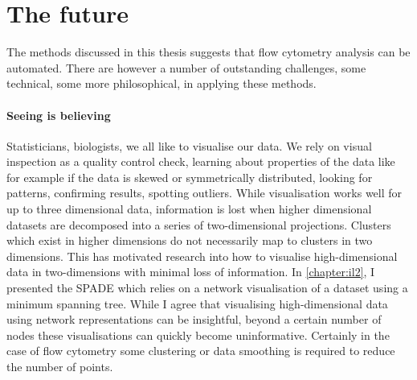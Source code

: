 
\section{ The future }

The methods discussed in this thesis suggests that flow cytometry analysis can be automated.
There are however a number of outstanding challenges, some technical, some more philosophical, in applying these methods.

\paragraph{Seeing is believing}

Statisticians, biologists, we all like to visualise our data.
We rely on visual inspection as a quality control check, learning about properties of the data like for example if the data
is skewed or symmetrically distributed, looking for patterns, confirming results, spotting outliers.
While visualisation works well for up to three dimensional data,
information is lost when higher dimensional datasets are decomposed into a series of two-dimensional projections.
Clusters which exist in higher dimensions do not necessarily map to clusters in two dimensions.
This has motivated research into how to visualise high-dimensional data in two-dimensions with minimal loss of information.
In \cref{chapter:il2}, I presented the SPADE which relies on a network visualisation of a dataset using a minimum spanning tree.
While I agree that visualising high-dimensional data using network representations can be insightful,
beyond a certain number of nodes these visualisations can quickly become uninformative.
Certainly in the case of flow cytometry some clustering or data smoothing is required to reduce the number of points.  


